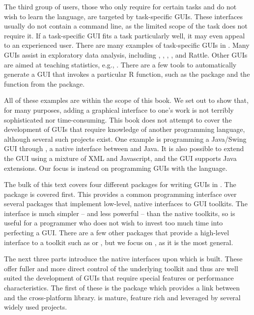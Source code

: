 The third group of users, those who only require  for
certain tasks and do not wish to learn the language, are targeted by
task-specific GUIs. These interfaces usually do not contain a command
line, as the limited scope of the task does not require it. If a
task-specific GUI fits a task particularly well, it may even appeal to
an experienced user. There are many examples of task-specific GUIs in
. Many GUIs assist in exploratory data analysis, including
, ,
, , and Rattle.  Other
GUIs are aimed at teaching statistics, e.g.,
. There are a few tools to automatically generate a
GUI that invokes a particular R function, such as the 
package and the  function from the
 package.

All of these examples are within the scope of this book. We set out to
show that, for many purposes, adding a graphical interface to one's
work is not terribly sophisticated nor time-consuming.  This book does
not attempt to cover the development of GUIs that require knowledge of
another programming language, although several such projects
exist. One example is programming a Java/Swing GUI through
, a native interface between \R\/ and Java. It is also
possible to extend the  GUI using a mixture of XML and
Javascript, and the  GUI supports Java extensions. Our
focus is instead on programming GUIs with the  language.

The bulk of this text covers four different packages for writing GUIs
in \R. The  package is covered first. This provides a
common programming interface over several \R\/ packages that implement
low-level, native interfaces to GUI toolkits. The 
interface is much simpler -- and less powerful -- than the native
toolkits, so is useful for a programmer who does not wish to invest
too much time into perfecting a GUI. There are a few other packages
that provide a high-level \R\/ interface to a toolkit such as
 or , but we focus on , as
it is the most general.


The next three parts introduce the native interfaces upon which
 is built. These offer fuller and more direct control of
the underlying toolkit and thus are well suited the development of GUIs
that require special features or performance characteristics.  The
first of these is the  package which provides a link
between \R\/ and the cross-platform \GTK\/ library. \GTK\/ is mature,
feature rich and leveraged by several widely used
projects. 

